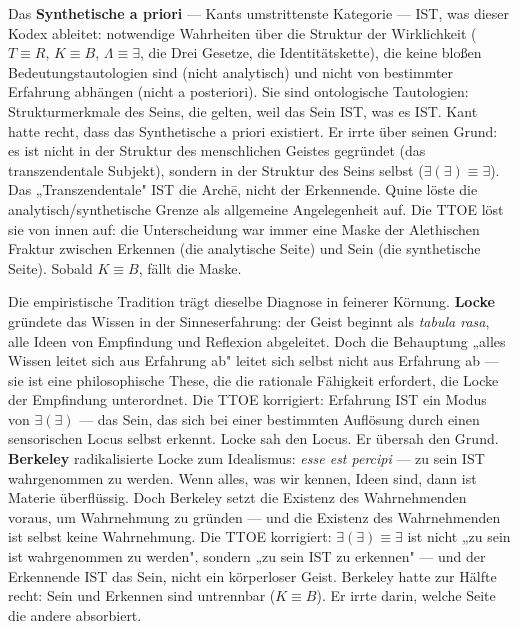 \documentclass[10pt, openany, oneside]{book}
\begin{document}
Das \textbf{Synthetische a priori} --- Kants umstrittenste Kategorie --- IST, was dieser Kodex ableitet: notwendige Wahrheiten über die Struktur der Wirklichkeit ($T \equiv R$, $K \equiv B$, $\Lambda \equiv \exists$, die Drei Gesetze, die Identitätskette), die keine bloßen Bedeutungstautologien sind (nicht analytisch) und nicht von bestimmter Erfahrung abhängen (nicht a posteriori). Sie sind ontologische Tautologien: Strukturmerkmale des Seins, die gelten, weil das Sein IST, was es IST. Kant hatte recht, dass das Synthetische a priori existiert. Er irrte über seinen Grund: es ist nicht in der Struktur des menschlichen Geistes gegründet (das transzendentale Subjekt), sondern in der Struktur des Seins selbst ($\exists(\exists) \equiv \exists$). Das „Transzendentale" IST die Arch\={e}, nicht der Erkennende. Quine löste die analytisch/synthetische Grenze als allgemeine Angelegenheit auf. Die TTOE löst sie von innen auf: die Unterscheidung war immer eine Maske der Alethischen Fraktur zwischen Erkennen (die analytische Seite) und Sein (die synthetische Seite). Sobald $K \equiv B$, fällt die Maske.

Die empiristische Tradition trägt dieselbe Diagnose in feinerer Körnung. \textbf{Locke} gründete das Wissen in der Sinneserfahrung: der Geist beginnt als \textit{tabula rasa}, alle Ideen von Empfindung und Reflexion abgeleitet. Doch die Behauptung „alles Wissen leitet sich aus Erfahrung ab" leitet sich selbst nicht aus Erfahrung ab --- sie ist eine philosophische These, die die rationale Fähigkeit erfordert, die Locke der Empfindung unterordnet. Die TTOE korrigiert: Erfahrung IST ein Modus von $\exists(\exists)$ --- das Sein, das sich bei einer bestimmten Auflösung durch einen sensorischen Locus selbst erkennt. Locke sah den Locus. Er übersah den Grund. \textbf{Berkeley} radikalisierte Locke zum Idealismus: \textit{esse est percipi} --- zu sein IST wahrgenommen zu werden. Wenn alles, was wir kennen, Ideen sind, dann ist Materie überflüssig. Doch Berkeley setzt die Existenz des Wahrnehmenden voraus, um Wahrnehmung zu gründen --- und die Existenz des Wahrnehmenden ist selbst keine Wahrnehmung. Die TTOE korrigiert: $\exists(\exists) \equiv \exists$ ist nicht „zu sein ist wahrgenommen zu werden", sondern „zu sein IST zu erkennen" --- und der Erkennende IST das Sein, nicht ein körperloser Geist. Berkeley hatte zur Hälfte recht: Sein und Erkennen sind untrennbar ($K \equiv B$). Er irrte darin, welche Seite die andere absorbiert.
\end{document}
